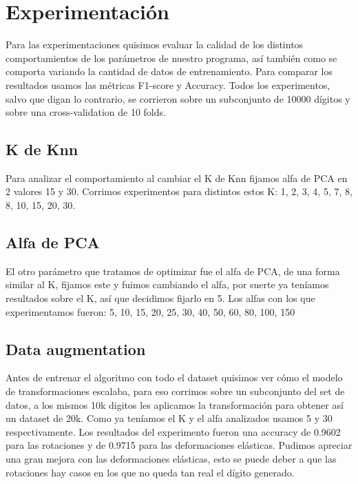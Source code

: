 \section{Experimentación}

Para las experimentaciones quisimos evaluar la calidad de los distintos comportamientos de los parámetros de nuestro programa, así también como se comporta variando la cantidad de datos de entrenamiento. Para comparar los resultados usamos las métricas F1-score y Accuracy. Todos los experimentos, salvo que digan lo contrario, se corrieron sobre un subconjunto de 10000 dígitos y sobre una cross-validation de 10 folds.

\subsection{K de Knn}

Para analizar el comportamiento al cambiar el K de Knn fijamos alfa de PCA en 2 valores 15 y 30. Corrimos experimentos para distintos estos K: 1, 2, 3, 4, 5, 7, 8, 8, 10, 15, 20, 30.


\subsection{Alfa de PCA}

El otro parámetro que tratamos de optimizar fue el alfa de PCA, de una forma similar al K, fijamos este y fuimos cambiando el alfa, por suerte ya teníamos resultados sobre el K, así que decidimos fijarlo en 5. Los alfas con los que experimentamos fueron: 5, 10, 15, 20, 25, 30, 40, 50, 60, 80, 100, 150


\subsection{Data augmentation}

Antes de entrenar el algoritmo con todo el dataset quisimos ver cómo el modelo de transformaciones escalaba, para eso corrimos sobre un subconjunto del set de datos, a los mismos 10k digitos les aplicamos la transformación para obtener así un dataset de 20k. Como ya teníamos el K y el alfa analizados usamos 5 y 30 respectivamente. Los resultados del experimento fueron una accuracy de 0.9602 para las rotaciones y de 0.9715 para las deformaciones elásticas. Pudimos apreciar una gran mejora con las deformaciones elásticas, esto se puede deber a que las rotaciones hay casos en los que no queda tan real el dígito generado.

